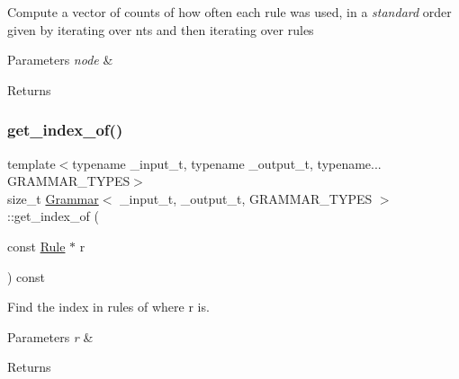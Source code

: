 Compute a vector of counts of how often each rule was used, in a {\itshape standard} order given by iterating over nts and then iterating over rules 
\begin{DoxyParams}{Parameters}
{\em node} & \\
\hline
\end{DoxyParams}
\begin{DoxyReturn}{Returns}

\end{DoxyReturn}
\mbox{\label{class_grammar_a4dc14b38ba87cdc516deac5028fa1032}} 
\subsubsection{\texorpdfstring{get\+\_\+index\+\_\+of()}{get\_index\_of()}}
{\footnotesize\ttfamily template$<$typename \+\_\+input\+\_\+t, typename \+\_\+output\+\_\+t, typename... G\+R\+A\+M\+M\+A\+R\+\_\+\+T\+Y\+P\+ES$>$ \\
size\+\_\+t \hyperlink{class_grammar}{Grammar}$<$ \+\_\+input\+\_\+t, \+\_\+output\+\_\+t, G\+R\+A\+M\+M\+A\+R\+\_\+\+T\+Y\+P\+ES $>$\+::get\+\_\+index\+\_\+of (\begin{DoxyParamCaption}\item[{const \hyperlink{class_rule}{Rule} $\ast$}]{r }\end{DoxyParamCaption}) const\hspace{0.3cm}{\ttfamily [inline]}}

Find the index in rules of where r is. 
\begin{DoxyParams}{Parameters}
{\em r} & \\
\hline
\end{DoxyParams}
\begin{DoxyReturn}{Returns}

\end{DoxyReturn}
\mbox{\label{class_grammar_ad340d2b8ee3b22ff8b697f917a50c0a5}} 
